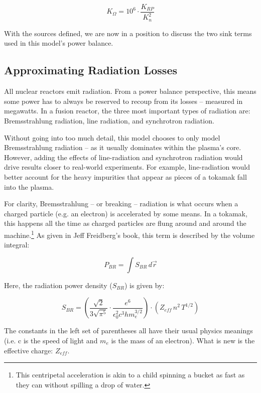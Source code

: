 \begin{equation}
	K_\Omega = 10^6 \cdot \frac{K_{RP}}{K_n^2}
\end{equation}

With the sources defined, we are now in a position to discuss the two sink terms used in this model's power balance.

\subsection{Approximating Radiation Losses}

All nuclear reactors emit radiation. From a power balance perspective, this means some power has to always be reserved to recoup from its losses -- measured in megawatts. In a fusion reactor, the three most important types of radiation are: Bremsstrahlung radiation, line radiation, and synchrotron radiation. 

Without going into too much detail, this model chooses to only model Bremsstrahlung radiation -- as it usually dominates within the plasma's core. However, adding the effects of line-radiation and synchrotron radiation would drive results closer to real-world experiments. For example, line-radiation would better account for the heavy impurities that appear as pieces of a tokamak fall into the plasma.

For clarity, Bremsstrahlung -- or breaking -- radiation is what occurs when a charged particle (e.g. an electron) is accelerated by some means. In a tokamak, this happens all the time as charged particles are flung around and around the machine.\footnote{This centripetal acceleration is akin to a child spinning a bucket as fast as they can without spilling a drop of water.} As given in Jeff Freidberg's book, this term is described by the volume integral:

\begin{equation}
	P_{BR} = \int S_{BR} \, d \vec{r}
\end{equation}

Here, the radiation power density ($S_{BR}$) is given by:

\begin{equation}
	S_{BR} = \left( \frac{\sqrt{2}}{3 \sqrt{\pi^5}} \cdot \frac{e^6}{\epsilon_0^2 c^3 h m_e^{3/2}} \right) \cdot \left( Z_{eff} \, n^2 \, T^{1/2} \right)
\end{equation}

The constants in the left set of parentheses all have their usual physics meanings (i.e. c is the speed of light and $m_e$ is the mass of an electron). What is new is the effective charge: $Z_{eff}$.

